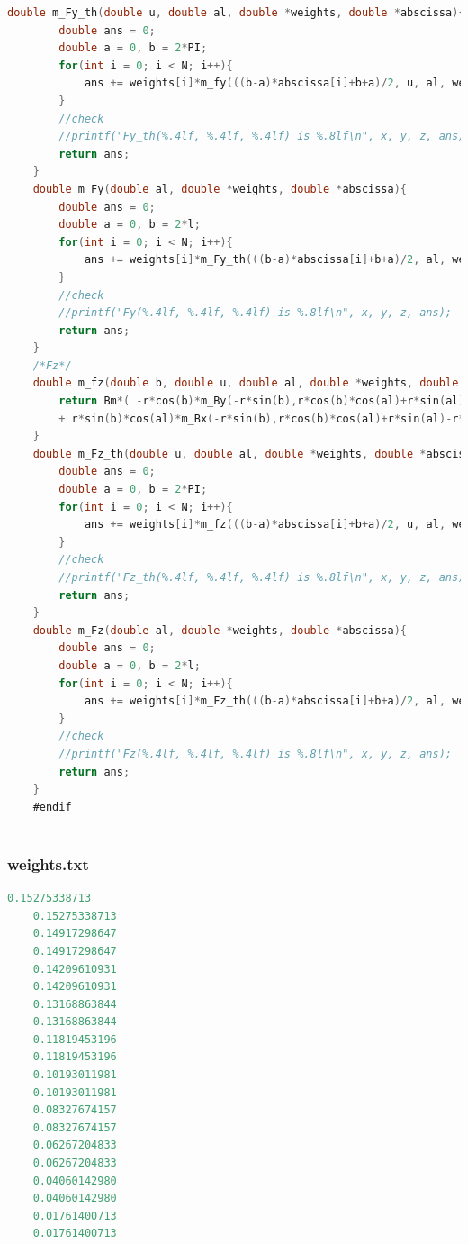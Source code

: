 \documentclass[AutoFakeBold]{LZUThesis}
\begin{document}
\begin{lstlisting}[language = C]
    double m_Fy_th(double u, double al, double *weights, double *abscissa){
        double ans = 0;
        double a = 0, b = 2*PI;
        for(int i = 0; i < N; i++){
            ans += weights[i]*m_fy(((b-a)*abscissa[i]+b+a)/2, u, al, weights, abscissa)*(b-a)/2;
        }
        //check
        //printf("Fy_th(%.4lf, %.4lf, %.4lf) is %.8lf\n", x, y, z, ans);
        return ans;
    }
    double m_Fy(double al, double *weights, double *abscissa){
        double ans = 0;
        double a = 0, b = 2*l;
        for(int i = 0; i < N; i++){
            ans += weights[i]*m_Fy_th(((b-a)*abscissa[i]+b+a)/2, al, weights, abscissa)*(b-a)/2;
        }
        //check
        //printf("Fy(%.4lf, %.4lf, %.4lf) is %.8lf\n", x, y, z, ans);
        return ans;
    }
    /*Fz*/
    double m_fz(double b, double u, double al, double *weights, double *abscissa){
        return Bm*( -r*cos(b)*m_By(-r*sin(b),r*cos(b)*cos(al)+r*sin(al)-r*cos(al),r*cos(b)*sin(al)-d-u*cos(al)-r*sin(al),weights,abscissa) \
        + r*sin(b)*cos(al)*m_Bx(-r*sin(b),r*cos(b)*cos(al)+r*sin(al)-r*cos(al),r*cos(b)*sin(al)-d-u*cos(al)-r*sin(al),weights,abscissa) );
    }
    double m_Fz_th(double u, double al, double *weights, double *abscissa){
        double ans = 0;
        double a = 0, b = 2*PI;
        for(int i = 0; i < N; i++){
            ans += weights[i]*m_fz(((b-a)*abscissa[i]+b+a)/2, u, al, weights, abscissa)*(b-a)/2;
        }
        //check
        //printf("Fz_th(%.4lf, %.4lf, %.4lf) is %.8lf\n", x, y, z, ans);
        return ans;
    }
    double m_Fz(double al, double *weights, double *abscissa){
        double ans = 0;
        double a = 0, b = 2*l;
        for(int i = 0; i < N; i++){
            ans += weights[i]*m_Fz_th(((b-a)*abscissa[i]+b+a)/2, al, weights, abscissa)*(b-a)/2;
        }
        //check
        //printf("Fz(%.4lf, %.4lf, %.4lf) is %.8lf\n", x, y, z, ans);
        return ans;
    }
    #endif
    
\end{lstlisting}
\subsubsection{weights.txt}
\begin{lstlisting}[language = C]
	0.15275338713
	0.15275338713
	0.14917298647
	0.14917298647
	0.14209610931
	0.14209610931
	0.13168863844
	0.13168863844
	0.11819453196
	0.11819453196
	0.10193011981
	0.10193011981
	0.08327674157
	0.08327674157
	0.06267204833
	0.06267204833
	0.04060142980
	0.04060142980
	0.01761400713
	0.01761400713
\end{lstlisting}
\end{document}
